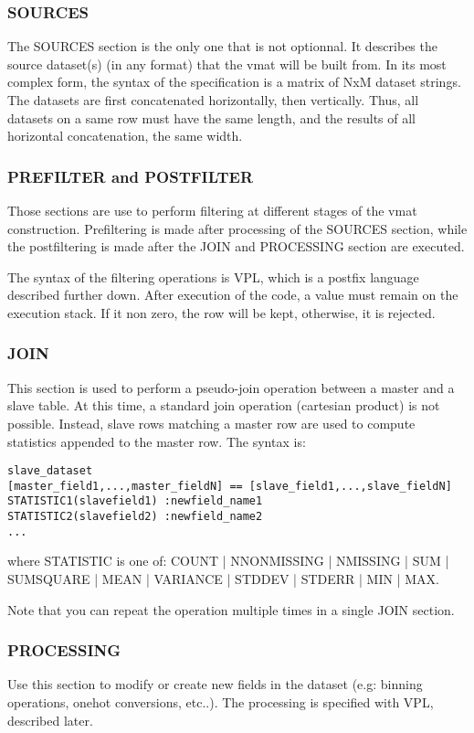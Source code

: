 \documentclass[11pt]{book}
\begin{document}
\subsubsection{SOURCES}
The SOURCES section is the only one that is not optionnal. It describes the source dataset(s) (in any format) that the vmat will be built from. In its most complex form, the syntax of the specification is a matrix of NxM dataset strings. The datasets are first concatenated horizontally, then vertically. Thus, all datasets on a same row must have the same length, and the results of all horizontal concatenation, the same width.

\subsubsection{PREFILTER and POSTFILTER}

Those sections are use to perform filtering at different stages of the vmat construction. Prefiltering is made after processing of the SOURCES section, while the postfiltering is made after the JOIN and PROCESSING section are executed. 

The syntax of the filtering operations is VPL, which is a postfix language described further down. After execution of the code, a value must remain on the execution stack. If it non zero, the row will be kept, otherwise, it is rejected.

\subsubsection{JOIN}

This section is used to perform a pseudo-join operation between a master and a slave table. At this time, a standard join operation (cartesian product) is not possible. Instead, slave rows matching a master row are used to compute statistics appended to the master row. The syntax is:

\begin{verbatim}
slave_dataset
[master_field1,...,master_fieldN] == [slave_field1,...,slave_fieldN]
STATISTIC1(slavefield1) :newfield_name1
STATISTIC2(slavefield2) :newfield_name2
...
\end{verbatim}
where STATISTIC is one of: {COUNT | NNONMISSING | NMISSING | SUM | SUMSQUARE | MEAN | VARIANCE | STDDEV | STDERR | MIN | MAX}. 

Note that you can repeat the operation multiple times in a single JOIN section.

\subsubsection{PROCESSING}
Use this section to modify or create new fields in the dataset (e.g: binning operations, onehot conversions, etc..). The processing is specified with VPL, described later.
\end{document}
